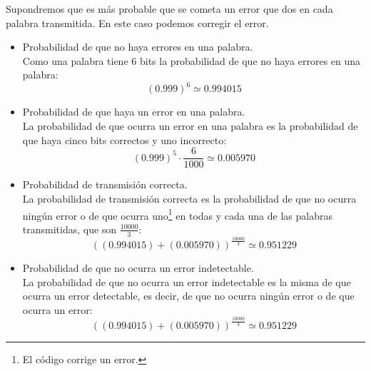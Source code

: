 Supondremos que es m\'as probable que se cometa un error que dos en
cada palabra transmitida. En este caso podemos corregir el error.
\begin{itemize}
\item Probabilidad de que no haya errores en una palabra.\\

Como una palabra tiene $6$ bits la probabilidad de que no haya errores en una
palabra:
$$(0.999)^6\simeq 0.994015$$
\item Probabilidad de que haya un error en una palabra.\\

La probabilidad de que ocurra un error en una palabra es la probabilidad de que
haya cinco bits correctos y uno incorrecto:
$$(0.999)^5\cdot \frac{6}{1000}\simeq 0.005970$$
\item Probabilidad de transmisi\'on correcta.\\

La probabilidad de transmisi\'on correcta es la probabilidad de que no ocurra
ning\'un error o de que ocurra uno\footnote{El c\'odigo corrige un error.} en
todas y cada una de las palabras transmitidas, que son $\frac{10000}{3}$:
$$((0.994015)+(0.005970))^{\frac{10000}{3}}\simeq 0.951229$$
\item Probabilidad de que no ocurra un error indetectable.\\

La probabilidad de que no ocurra un error indetectable es la misma de que ocurra
un error detectable, es decir, de que no ocurra ning\'un error o de que ocurra
un error:
\begin{displaymath}
((0.994015)+(0.005970))^{\frac{10000}{3}}\simeq 0.951229
\end{displaymath}
\end{itemize}

